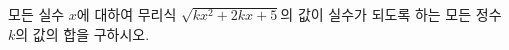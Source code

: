 \hspace*{2mm}\begin{minipage}[t]{\dimexpr\linewidth-2mm\relax}\vspace{0pt}
모든 실수 $x$에 대하여 무리식 $\sqrt{kx^2+2kx+5}$의 값이 실수가 되도록 하는 모든 정수 $k$의 값의 합을 구하시오.\end{minipage}
